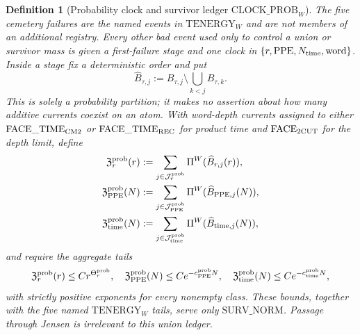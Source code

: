 \documentclass[11pt]{article}
\newtheorem{definition}[theorem]{Definition}
\begin{document}
\begin{definition}[Probability clock and survivor ledger
$\mathrm{CLOCK\_PROB}_{W}$]
\label{def:probability-clock}
The five cemetery failures are the named events in
$\mathrm{TENERGY}_{W}$ and are not members of an additional registry.
Every other bad event used only to control a union or survivor mass is given
a first-failure stage and one clock in
$\{r,\mathrm{PPE},N_{\rm time},\mathrm{word}\}$.  Inside a stage fix a
deterministic order and put
\begin{equation}
\label{eq:clock-prob-first-hit}
 \widehat B_{\tau,j}:=B_{\tau,j}\setminus\bigcup_{k<j}B_{\tau,k}.
\end{equation}
This is solely a probability partition; it makes no assertion about how many
additive currents coexist on an atom.  With word-depth currents assigned to
either $\mathrm{FACE\_TIME}_{\rm CM2}$ or
$\mathrm{FACE\_TIME}_{\rm REC}$ for product time and
$\mathrm{FACE}_{\rm 2CUT}$ for the depth limit, define
\begin{align}
 \mathfrak Z_{r}^{\rm prob}(r)
 &:=\sum_{j\in\mathcal J_r^{\rm prob}}
      \Pi^W(\widehat B_{r,j}(r)),\notag\\
 \mathfrak Z_{\rm PPE}^{\rm prob}(N)
 &:=\sum_{j\in\mathcal J_{\rm PPE}^{\rm prob}}
      \Pi^W(\widehat B_{{\rm PPE},j}(N)),\notag\\
 \mathfrak Z_{\rm time}^{\rm prob}(N)
 &:=\sum_{j\in\mathcal J_{\rm time}^{\rm prob}}
      \Pi^W(\widehat B_{{\rm time},j}(N)),
 \label{eq:clock-prob-partitions}
\end{align}
and require the aggregate tails
\begin{equation}
\label{eq:clock-prob-tails}
 \mathfrak Z_r^{\rm prob}(r)\le Cr^{\Theta_r^{\rm prob}},\quad
 \mathfrak Z_{\rm PPE}^{\rm prob}(N)\le Ce^{-c_{\rm PPE}^{\rm prob}N},
 \quad
 \mathfrak Z_{\rm time}^{\rm prob}(N)\le Ce^{-c_{\rm time}^{\rm prob}N},
\end{equation}
with strictly positive exponents for every nonempty class.  These bounds,
together with the five named $\mathrm{TENERGY}_{W}$ tails, serve only
$\mathrm{SURV\_NORM}$.  Passage through Jensen is irrelevant to this union
ledger.
\end{definition}
\end{document}
